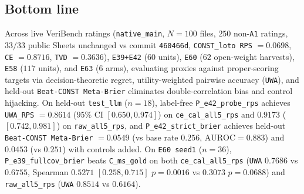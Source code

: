 
\subsection*{Bottom line}
Across live VeriBench ratings (\texttt{native\_main}, $N=100$ files, $250$ non-\texttt{A1} ratings, $33/33$ public Sheets unchanged vs commit \texttt{460466d}, \texttt{CONST\_loto RPS} $= 0.0698$, \texttt{CE} $= 0.8716$, \texttt{TVD} $= 0.3636$), \texttt{E39+E42} ($60$ units), \texttt{E60} ($62$ open-weight harvests), \texttt{E58} ($117$ units), and \texttt{E63} ($6$ arms), evaluating proxies against proper-scoring targets via decision-theoretic regret, utility-weighted pairwise accuracy (\texttt{UWA}), and held-out \texttt{Beat-CONST Meta-Brier} eliminates double-correlation bias and control hijacking. On held-out \texttt{test\_llm} ($n=18$), label-free \texttt{P\_e42\_probe\_rps} achieves \texttt{UWA\_RPS} $= 0.8614$ ($95\%$ CI $[0.650, 0.974]$) on \texttt{ce\_cal\_all5\_rps} and $0.9173$ ($[0.742, 0.981]$) on \texttt{raw\_all5\_rps}, and \texttt{P\_e42\_strict\_brier} achieves held-out \texttt{Beat-CONST Meta-Brier} $= 0.0549$ (vs base rate $0.256$, $\mathrm{AUROC} = 0.883$) and $0.0453$ (vs $0.251$) with controls added. On \texttt{E60 seed1} ($n=36$), \texttt{P\_e39\_fullcov\_brier} beats \texttt{C\_ms\_gold} on both \texttt{ce\_cal\_all5\_rps} (\texttt{UWA} $0.7686$ vs $0.6755$, Spearman $0.5271$ $[0.258, 0.715]$ $p=0.0016$ vs $0.3073$ $p=0.0688$) and \texttt{raw\_all5\_rps} (\texttt{UWA} $0.8514$ vs $0.6164$).

